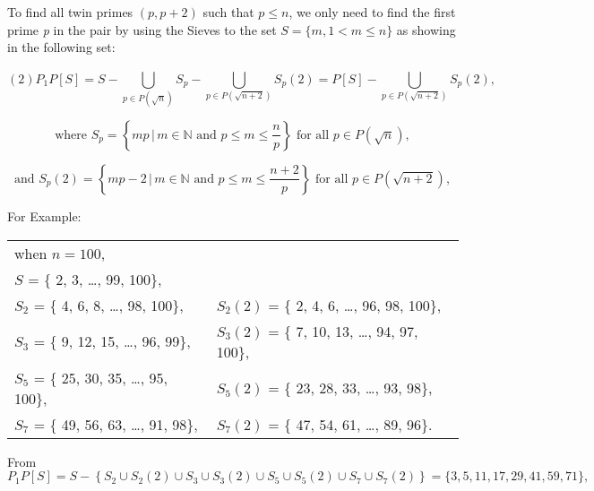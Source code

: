 \documentclass{aomart}
\begin{document}
 To find all twin primes \( (p,  p+2)\) such that \( p\leq n\), we only need to find the first prime \textit{p} in the pair by using  {the Sieves to the set }\( S = \{ m,  1<m\leq n\}\) as showing in the following  {set}:

\begin{equation}
\left(2\right)                  P_{1}P\left[S\right] =  S- \bigcup_{p\in P\left(\sqrt{n}\right)}^{} S_{p} - \bigcup_{p\in P\left(\sqrt{n+2}\right)}^{}S_{p}\left(2\right) =  P\left[S\right]-\bigcup_{p\in P\left(\sqrt{n+2}\right)}^{}S_{p}\left(2\right) ,
\end{equation}

\begin{equation}
\text{where } S_{p} = \left\{ mp \, | \, m \in \mathbb{N} \text{ and } p \leq m \leq \frac{n}{p} \right\} \text{ for all } p \in P(\sqrt{n}),
\end{equation}

\begin{equation}
\text{and } S_{p}(2) = \left\{ mp-2 \, | \, m \in \mathbb{N} \text{ and } p \leq m \leq \frac{n+2}{p} \right\} \text{ for all } p \in P(\sqrt{n+2}),
\end{equation}

\vspace{1\baselineskip}

For Example:
\begin{center}
\begin{tabular}{ll}
when \( n = 100\), & \\
\( S \)              = \{ 2, 3, \ldots , 99, 100\},                & \\
\( S_{2} \)          = \{ 4, 6, 8, \ldots , 98, 100\},            & \( S_{2}(2) \)       = \{ 2, 4, 6, \ldots , 96, 98, 100\}, \\
\( S_{3} \)          = \{ 9, 12, 15, \ldots , 96, 99\},           & \( S_{3}(2) \)       = \{ 7, 10, 13, \ldots , 94, 97, 100\}, \\
\( S_{5} \)          = \{ 25, 30, 35, \ldots , 95, 100\},         & \( S_{5}(2) \)       = \{ 23, 28, 33, \ldots , 93, 98\}, \\
\( S_{7} \)          = \{ 49, 56, 63, \ldots , 91, 98\},          & \( S_{7}(2) \)       = \{ 47, 54, 61, \ldots , 89, 96\}. \\
\end{tabular}
\end{center}
\vspace{1\baselineskip}
From
\begin{equation}
  P_{1}P\left[S\right] = S-\left\{ S_{2}\cup  S_{2}\left(2\right)\cup  S_{3}\cup  S_{3}\left(2\right)\cup  S_{5}\cup  S_{5}\left(2\right)\cup  S_{7}\cup  S_{7}\left(2\right)\right\}  = \{ 3, 5, 11, 17, 29, 41, 59, 71\} ,
\end{equation}
\end{document}
